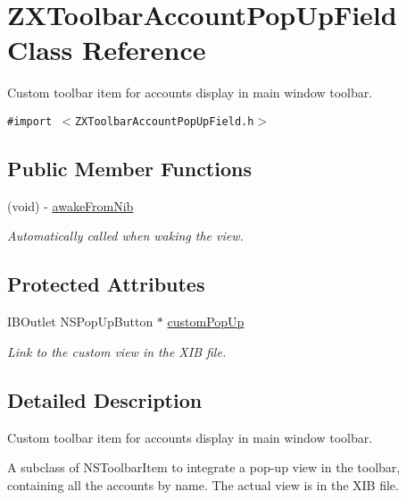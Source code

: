 \hypertarget{interface_z_x_toolbar_account_pop_up_field}{
\section{ZXToolbarAccountPopUpField Class Reference}
\label{interface_z_x_toolbar_account_pop_up_field}
}
Custom toolbar item for accounts display in main window toolbar.  


{\tt \#import $<$ZXToolbarAccountPopUpField.h$>$}

\subsection*{Public Member Functions}
\begin{CompactItemize}
\item 
(void) - \hyperlink{interface_z_x_toolbar_account_pop_up_field_1e30ad7a1502bd0693ddb54423c0516b}{awakeFromNib}
\begin{CompactList}\small\item\em Automatically called when waking the view. \item\end{CompactList}\end{CompactItemize}
\subsection*{Protected Attributes}
\begin{CompactItemize}
\item 
IBOutlet NSPopUpButton $\ast$ \hyperlink{interface_z_x_toolbar_account_pop_up_field_0cf6a25bc50454e899ab37ff77340753}{customPopUp}
\begin{CompactList}\small\item\em Link to the custom view in the XIB file. \item\end{CompactList}\end{CompactItemize}


\subsection{Detailed Description}
Custom toolbar item for accounts display in main window toolbar. 

A subclass of NSToolbarItem to integrate a pop-up view in the toolbar, containing all the accounts by name. The actual view is in the XIB file. 

